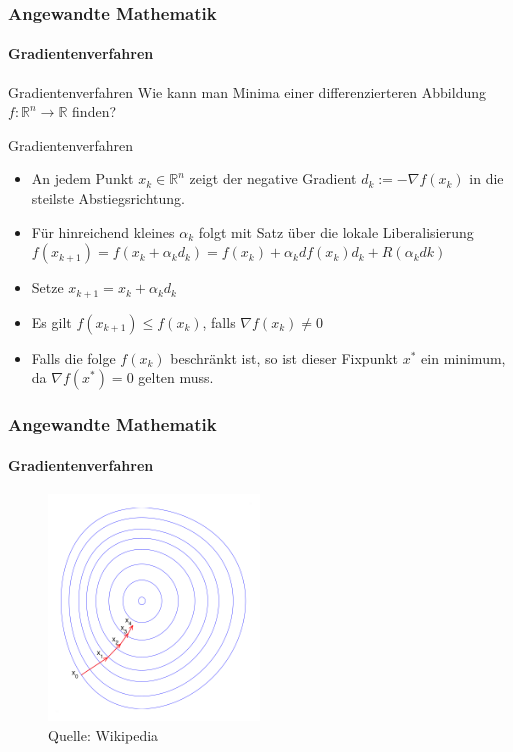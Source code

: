 \documentclass{beamer}
\begin{document}
\begin{frame}
    \frametitle{Angewandte Mathematik}
\framesubtitle{Gradientenverfahren}
    \begin{block}{Gradientenverfahren}
Wie kann man Minima einer  differenzierteren Abbildung $f: \mathbb{R}^n \to \mathbb{R}$ finden? 
 
\end{block}

    \begin{block}{Gradientenverfahren}
\begin{itemize}
\item An jedem Punkt $x_k \in  \mathbb{R}^n$ zeigt der negative Gradient  $d_k := -\nabla f (x_k)$ in die steilste Abstiegsrichtung.
\item Für hinreichend kleines $\alpha_k$ folgt mit Satz über die lokale Liberalisierung  
$f(x_{k+1}) = f (x_k + \alpha_k d_k) =  f(x_k) + \alpha_k df(x_k)d_k + R( \alpha_k dk)$
\item  Setze $x_{k+1} = x_k + \alpha_k d_k$ 
\item Es gilt $f(x_{k+1}) \leq f(x_k)$, falls $\nabla f(x_k) \neq 0$
\item  Falls die folge $f(x_k)$ beschränkt ist, so ist  dieser Fixpunkt $x^*$ ein minimum, da $\nabla f(x^*) = 0$ gelten muss.  
\end{itemize}

\end{block}
 \end{frame}



\begin{frame}
    \frametitle{Angewandte Mathematik}
\framesubtitle{Gradientenverfahren}
\begin{figure}[H]
      \centering
    \includegraphics[width=0.5\textwidth]{images/Gradient_descent}
      \caption{Quelle: Wikipedia}
\end{figure}

 \end{frame}
\end{document}
